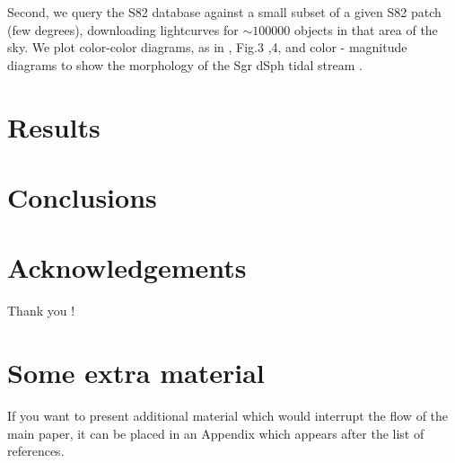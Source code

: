 \documentclass[fleqn,usenatbib]{mnras} %
\begin{document}
Second, we query the S82 database against a small subset of a given S82 patch (few degrees), downloading lightcurves for $\sim100 000 $ objects in that area of the sky. We plot color-color diagrams, as in \cite{sesar2007}, Fig.3 ,4, and color - magnitude diagrams to show the morphology of the Sgr dSph tidal stream \citep{sesar2010}.  





\section{Results}

\section{Conclusions}

\section*{Acknowledgements}
Thank you ! 









\appendix

\section{Some extra material}

If you want to present additional material which would interrupt the flow of the main paper,
it can be placed in an Appendix which appears after the list of references.



\bsp	%
\label{lastpage}
\end{document}
